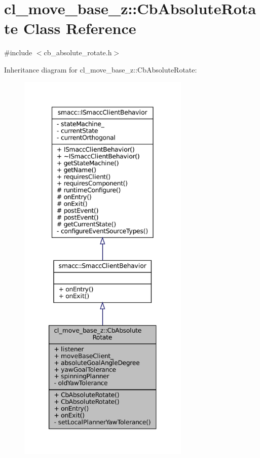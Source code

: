\hypertarget{classcl__move__base__z_1_1CbAbsoluteRotate}{}\section{cl\+\_\+move\+\_\+base\+\_\+z\+:\+:Cb\+Absolute\+Rotate Class Reference}
\label{classcl__move__base__z_1_1CbAbsoluteRotate}


{\ttfamily \#include $<$cb\+\_\+absolute\+\_\+rotate.\+h$>$}



Inheritance diagram for cl\+\_\+move\+\_\+base\+\_\+z\+:\+:Cb\+Absolute\+Rotate\+:
\nopagebreak
\begin{figure}[H]
\begin{center}
\leavevmode
\includegraphics[height=550pt]{classcl__move__base__z_1_1CbAbsoluteRotate__inherit__graph}
\end{center}
\end{figure}



